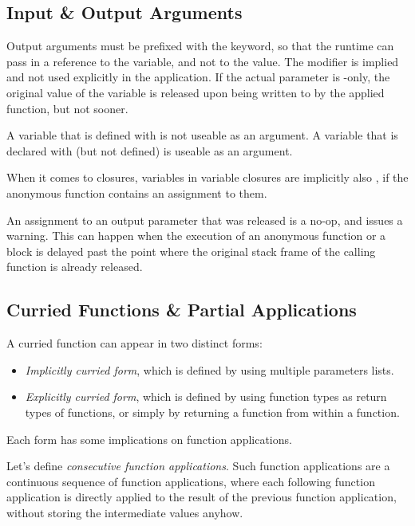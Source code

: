 \subsection{Input \& Output Arguments}
\label{sec:io-arguments}

Output arguments must be prefixed with the  keyword, so that the runtime can pass in a reference to the variable, and not to the value. The  modifier is implied and not used explicitly in the application. If the actual parameter is -only, the original value of the variable is released upon being written to by the applied function, but not sooner. 

A variable that is defined with  is not useable as an  argument. A variable that is declared with  (but not defined) is useable as an  argument. 

When it comes to closures, variables in variable closures are implicitly also , if the anonymous function contains an assignment to them. 

An assignment to an output parameter that was released is a no-op, and issues a warning. This can happen when the execution of an anonymous function or a block is delayed past the point where the original stack frame of the calling function is already released. 






\subsection{Curried Functions \& Partial Applications}
\label{sec:curried-functions}
\label{sec:partial-applications}

A curried function can appear in two distinct forms:
\begin{itemize}
\item[] {\em Implicitly curried form}, which is defined by using multiple parameters lists. 
\item[] {\em Explicitly curried form}, which is defined by using function types as return types of functions, or simply by returning a function from within a function. 
\end{itemize}

Each form has some implications on function applications. 

Let's define {\em consecutive function applications}. Such function applications are a continuous sequence of function applications, where each following function application is directly applied to the result of the previous function application, without storing the intermediate values anyhow. 

